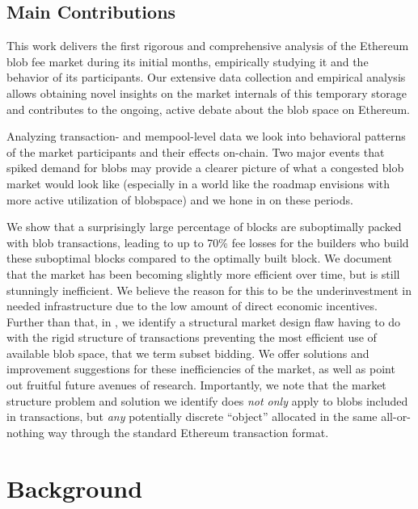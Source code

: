 \subsection{Main Contributions}

This work delivers the first rigorous and comprehensive analysis of the Ethereum blob fee market during its initial months, empirically studying it and the behavior of its participants. Our extensive data collection and empirical analysis allows obtaining novel insights on the market internals of this temporary storage and contributes to the ongoing, active debate about the blob space on Ethereum.

Analyzing transaction- and mempool-level data we look into behavioral patterns of the market participants and their effects on-chain.
Two major events that spiked demand for blobs may provide a clearer picture of what a congested blob market would look like (especially in a world like the roadmap envisions with more active utilization of blobspace) and we hone in on these periods.

We show that a surprisingly large percentage of blocks are suboptimally packed with blob transactions, leading to up to 70\% fee losses for the builders who build these suboptimal blocks compared to the optimally built block.
We document that the market has been becoming slightly more efficient over time, but is still stunningly inefficient. We believe the reason for this to be the underinvestment in needed infrastructure due to the low amount of direct economic incentives.
Further than that, in , we identify a structural market design flaw having to do with the rigid structure of transactions preventing the most efficient use of available blob space, that we term subset bidding.
We offer solutions and improvement suggestions for these inefficiencies of the market, as well as point out fruitful future avenues of research.
Importantly, we note that the market structure problem and solution we identify does \emph{not only} apply to blobs included in transactions, but \emph{any} potentially discrete ``object'' allocated in the same all-or-nothing way through the standard Ethereum transaction format.













\section{Background}

